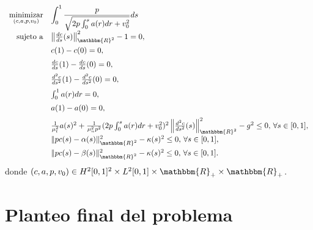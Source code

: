 \documentclass[10pt,mathserif]{beamer}
\newcommand{\R}{\mathbbm{R}}
\begin{document}
\begin{frame}{}
\vspace{-0.5cm}\begin{small}
\begin{equation*}
\begin{array}{rl}
\displaystyle \mathop{\mathrm{minimizar}}_{(c,a,p,v_0)} & \displaystyle \int_{0}^{1} \frac{p}{\sqrt{2p \int_0^s a(r)dr + v_0^2}}ds \\
 \mathrm{sujeto \ a} & \left\|\frac{dc}{ds}(s)\right\|_{\R^2}^2-1=0,\\[2mm]
                     & c(1)-c(0)=0,\\[2mm]
                     & \frac{dc}{ds}(1)-\frac{dc}{ds}(0)=0,\\[2mm]
                     & \frac{d^2c}{ds^2}(1)-\frac{d^2c}{ds^2}(0)=0,\\[2mm]
                     & \int_{0}^{1} a(r)dr=0,\\[2mm]
                     & a(1)-a(0)=0,\\[2mm]
                     & \frac{1}{\mu_t^2} a(s)^2 + \frac{1}{\mu_n^2 p^2}(2p \int_0^s a(r)dr + v_0^2)^2\left\| \frac{d^2 c}{ds^2}(s) \right\|_{\R^2}^2-g^2\leq 0,\,\forall s\in[0,1],\\[2mm]
                     &  \|pc(s)-\alpha(s)\|_{\R^2}^2-\kappa(s)^2 \leq 0,\,\forall s\in[0,1], \\[2mm]
                     &  \|pc(s)-\beta(s)\|_{\R^2}^2-\kappa(s)^2 \leq 0, \,\forall s\in[0,1].

  \end{array}
\end{equation*}
donde $(c,a,p,v_0)\in H^2[0,1]^2 \times L^2[0,1]\times \R_+\times \R_+$. 
\end{small}
\end{frame}
% 
% 
% 




\section{Planteo final del problema}
\end{document}
